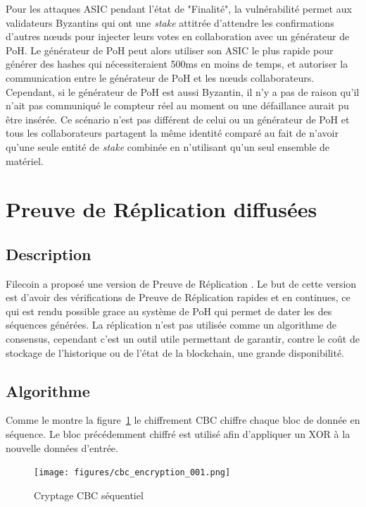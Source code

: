 \documentclass[12pt]{article}
\begin{document}
Pour les attaques ASIC pendant l'état de "Finalité", la vulnérabilité permet aux validateurs Byzantins qui ont une \textit{stake} attitrée d’attendre les confirmations d’autres nœuds pour injecter leurs votes en collaboration avec un générateur de PoH. Le générateur de PoH peut alors utiliser son ASIC le plus rapide pour générer des hashes qui nécessiteraient 500ms en moins de temps, et autoriser la communication entre le générateur de PoH et les nœuds collaborateurs. Cependant, si le générateur de PoH est aussi Byzantin, il n’y a pas de raison qu'il n’ait pas communiqué le compteur réel au moment ou une défaillance aurait pu être insérée. Ce scénario n’est pas différent de celui ou un générateur de PoH et tous les collaborateurs partagent la même identité comparé au fait de n'avoir qu'une seule entité de \textit{stake} combinée en n’utilisant qu’un seul ensemble de matériel.

\section{Preuve de Réplication diffusées}\label{porep}
\subsection{Description}
Filecoin a proposé une version de Preuve de Réplication \cite{filecoinporep}. Le but de cette version est d’avoir des vérifications de Preuve de Réplication rapides et en continues, ce qui est rendu possible grace au système de PoH qui permet de dater les des séquences générées. La réplication n’est pas utilisée comme un algorithme de consensus, cependant c'est un outil utile permettant de garantir, contre le coût de stockage de l’historique ou de l’état de la blockchain, une grande disponibilité.
\subsection{Algorithme}
Comme le montre la figure~\ref{fig:encrypt} le chiffrement CBC chiffre chaque bloc de donnée en séquence. Le bloc précédemment chiffré est utilisé afin d'appliquer un XOR à la nouvelle données d'entrée.

\begin{figure}[h]
  \begin{center}
    \centering
    \texttt{[image: figures/cbc\_encryption\_001.png]}
    \caption[Fig 7]{Cryptage CBC séquentiel\label{fig:encrypt}}
  \end{center}
  \end{figure}
\end{document}

